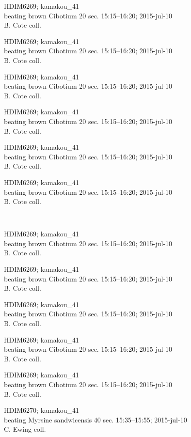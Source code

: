 \documentclass[2pt]{extarticle}
\begin{document}
\noindent
\parbox{0.16\textwidth}{\tiny \raggedright \rule[-0.3\baselineskip]{0pt}{10pt}HDIM6269; kamakou\_41\\ beating brown Cibotium 20 sec. 15:15--16:20; 2015-jul-10\\ B. Cote coll.}
\parbox{0.16\textwidth}{\tiny \raggedright \rule[-0.3\baselineskip]{0pt}{10pt}HDIM6269; kamakou\_41\\ beating brown Cibotium 20 sec. 15:15--16:20; 2015-jul-10\\ B. Cote coll.}
\parbox{0.16\textwidth}{\tiny \raggedright \rule[-0.3\baselineskip]{0pt}{10pt}HDIM6269; kamakou\_41\\ beating brown Cibotium 20 sec. 15:15--16:20; 2015-jul-10\\ B. Cote coll.}
\parbox{0.16\textwidth}{\tiny \raggedright \rule[-0.3\baselineskip]{0pt}{10pt}HDIM6269; kamakou\_41\\ beating brown Cibotium 20 sec. 15:15--16:20; 2015-jul-10\\ B. Cote coll.}
\parbox{0.16\textwidth}{\tiny \raggedright \rule[-0.3\baselineskip]{0pt}{10pt}HDIM6269; kamakou\_41\\ beating brown Cibotium 20 sec. 15:15--16:20; 2015-jul-10\\ B. Cote coll.}
\parbox{0.16\textwidth}{\tiny \raggedright \rule[-0.3\baselineskip]{0pt}{10pt}HDIM6269; kamakou\_41\\ beating brown Cibotium 20 sec. 15:15--16:20; 2015-jul-10\\ B. Cote coll.} \\ 
\vspace{0.001in} 

\noindent
\parbox{0.16\textwidth}{\tiny \raggedright \rule[-0.3\baselineskip]{0pt}{10pt}HDIM6269; kamakou\_41\\ beating brown Cibotium 20 sec. 15:15--16:20; 2015-jul-10\\ B. Cote coll.}
\parbox{0.16\textwidth}{\tiny \raggedright \rule[-0.3\baselineskip]{0pt}{10pt}HDIM6269; kamakou\_41\\ beating brown Cibotium 20 sec. 15:15--16:20; 2015-jul-10\\ B. Cote coll.}
\parbox{0.16\textwidth}{\tiny \raggedright \rule[-0.3\baselineskip]{0pt}{10pt}HDIM6269; kamakou\_41\\ beating brown Cibotium 20 sec. 15:15--16:20; 2015-jul-10\\ B. Cote coll.}
\parbox{0.16\textwidth}{\tiny \raggedright \rule[-0.3\baselineskip]{0pt}{10pt}HDIM6269; kamakou\_41\\ beating brown Cibotium 20 sec. 15:15--16:20; 2015-jul-10\\ B. Cote coll.}
\parbox{0.16\textwidth}{\tiny \raggedright \rule[-0.3\baselineskip]{0pt}{10pt}HDIM6269; kamakou\_41\\ beating brown Cibotium 20 sec. 15:15--16:20; 2015-jul-10\\ B. Cote coll.}
\parbox{0.16\textwidth}{\tiny \raggedright \rule[-0.3\baselineskip]{0pt}{10pt}HDIM6270; kamakou\_41\\ beating Myrsine sandwicensis 40 sec. 15:35--15:55; 2015-jul-10\\ C. Ewing coll.} \\ 
\vspace{0.001in} 
\end{document}
